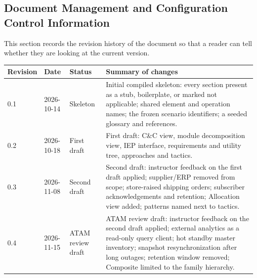 \subsection{Document Management and Configuration Control Information}
\label{sec:doc-control}

This section records the revision history of the document so that a reader can tell
whether they are looking at the current version.

\begin{tabularx}{\linewidth}{|l|l|l|X|}
\hline
\textbf{Revision} & \textbf{Date} & \textbf{Status} & \textbf{Summary of changes}\\\hline
0.1 & 2026-10-14 & Skeleton & Initial compiled skeleton: every section present as a stub, boilerplate, or marked not applicable; shared element and operation names; the frozen scenario identifiers; a seeded glossary and references.\\\hline
0.2 & 2026-10-18 & First draft & First draft: C\&C view, module decomposition view, IEP interface, requirements and utility tree, approaches and tactics.\\\hline
0.3 & 2026-11-08 & Second draft & Second draft: instructor feedback on the first draft applied; supplier/ERP removed from scope; store-raised shipping orders; subscriber acknowledgements and retention; Allocation view added; patterns named next to tactics.\\\hline
0.4 & 2026-11-15 & ATAM review draft & ATAM review draft: instructor feedback on the second draft applied; external analytics as a read-only query client; hot standby master inventory; snapshot resynchronization after long outages; retention window removed; Composite limited to the family hierarchy.\\\hline
\end{tabularx}
